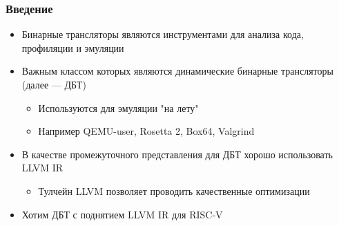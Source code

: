 \documentclass{beamer}
\begin{document}
\begin{frame}[fragile]
	\frametitle{Введение}
	\begin{itemize}
		\item Бинарные трансляторы являются инструментами для анализа кода, профиляции и эмуляции
		\item Важным классом которых являются динамические бинарные трансляторы (далее --- ДБТ)
		      \begin{itemize}
			      \item Используются для эмуляции "на лету"
			      \item Например QEMU-user, Rosetta 2, Box64, Valgrind
		      \end{itemize}
		\item В качестве промежуточного представления для ДБТ хорошо использовать LLVM IR
		      \begin{itemize}
			      \item Тулчейн LLVM позволяет проводить качественные оптимизации
		      \end{itemize}
		\item Хотим ДБТ с поднятием LLVM IR для RISC-V
	\end{itemize}
\end{frame}


\end{document}
